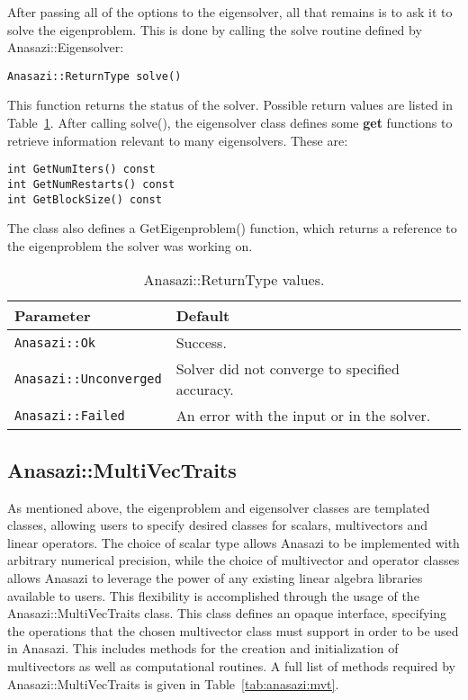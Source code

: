 After passing all of the options to the eigensolver, all that remains is to ask
it to solve the eigenproblem. This is done by calling the solve routine 
defined by Anasazi::Eigensolver:
\begin{verbatim}
Anasazi::ReturnType solve()
\end{verbatim}
This function returns the status of the solver. Possible return values are
listed in Table~\ref{tab:anasazi:rt}. After calling solve(), the
eigensolver class defines some \textbf{get} functions to retrieve information
relevant to many eigensolvers. These are:
\begin{verbatim}
int GetNumIters() const
int GetNumRestarts() const
int GetBlockSize() const 
\end{verbatim}
The class also defines a GetEigenproblem() function, which returns a
reference to the eigenproblem the solver was working on.

\begin{table}
\begin{center}
\begin{tabular}{| p{6cm} l |}
\hline
Parameter & Default \\
\hline
\verb!Anasazi::Ok!         & Success. \\
\verb!Anasazi::Unconverged!& Solver did not converge to specified accuracy. \\
\verb!Anasazi::Failed!     & An error with the input or in the solver. \\
\hline
\end{tabular}
\caption{Anasazi::ReturnType values.}
\label{tab:anasazi:rt}
\end{center}
\end{table}

\subsection{Anasazi::MultiVecTraits}
\label{sec:anasazi:mvt}

As mentioned above, the eigenproblem and eigensolver classes are templated
classes, allowing users to specify desired classes for scalars, multivectors
and linear operators. The choice of scalar type allows Anasazi to be implemented
with arbitrary numerical precision, while the choice of multivector and operator
classes allows Anasazi to leverage the power of any existing linear algebra
libraries available to users. This flexibility is accomplished through the
usage of the Anasazi::MultiVecTraits class. This class defines an opaque
interface, specifying the operations that the chosen multivector class must
support in order to be used in Anasazi. This includes methods for the creation
and initialization of multivectors as well as computational routines. A full
list of methods required by Anasazi::MultiVecTraits is given in
Table~\ref{tab:anasazi:mvt}.

